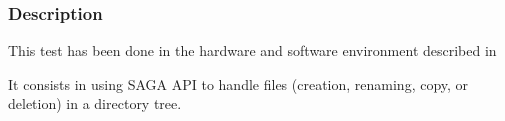 






\subsubsection{Description}


This test has been done in the hardware and software environment
described in  

It consists in using SAGA API to handle files (creation, renaming, copy,
or deletion) in a directory tree.




